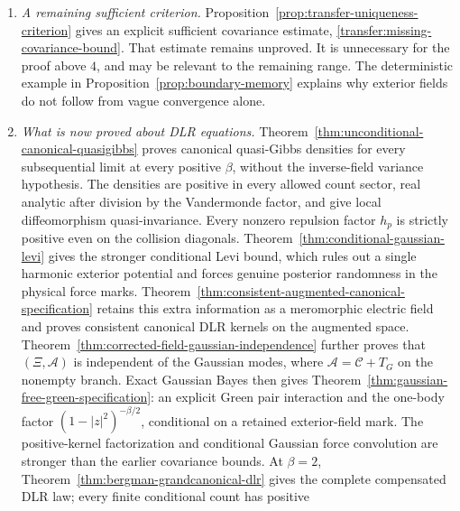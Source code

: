 \documentclass[11pt,a4paper]{article}
\numberwithin{equation}{section}
\theoremstyle{definition}
\theoremstyle{remark}
\begin{document}
\begin{enumerate}
to be analyzed. The independent reference has a Bergman limit for
every parameter, but its Gram likelihood is asymptotically singular
for $\beta\ge4$; direct transfer of that limit is therefore impossible
in that range. At $\beta=4$, the explicit hypergeometric mixture in
Theorem~\ref{thm:critical-su11-hypergeometric} reduces fixed orbital
occupations to primary-sector masses. Critical emptiness implies decay
of every fixed primary-sector occupation, although no direct norm
asymptotic or quantitative critical rate is obtained.
\item \emph{A remaining sufficient criterion.}
Proposition~\ref{prop:transfer-uniqueness-criterion} gives an explicit
sufficient covariance estimate, \eqref{transfer:missing-covariance-bound}.
That estimate remains unproved. It is unnecessary for the proof above
$4$, and may be relevant to the remaining range. The deterministic
example in Proposition~\ref{prop:boundary-memory} explains why exterior
fields do not follow from vague convergence alone.
\item \emph{What is now proved about DLR equations.}
Theorem~\ref{thm:unconditional-canonical-quasigibbs} proves canonical
quasi-Gibbs densities for every subsequential limit at every positive
$\beta$, without the inverse-field variance hypothesis. The densities
are positive in every allowed count sector, real analytic after
division by the Vandermonde factor, and give local diffeomorphism
quasi-invariance. Every nonzero repulsion factor $h_p$ is strictly
positive even on the collision diagonals. Theorem~\ref{thm:conditional-gaussian-levi}
gives the stronger conditional Levi bound, which rules out a single
harmonic exterior potential and forces genuine posterior randomness
in the physical force marks.
Theorem~\ref{thm:consistent-augmented-canonical-specification} retains
this extra information as a meromorphic electric field and proves
consistent canonical DLR kernels on the augmented space.
Theorem~\ref{thm:corrected-field-gaussian-independence} further proves
that $(\Xi,\mathcal A)$ is independent of the Gaussian modes, where
$\mathcal A=\mathcal C+T_G$ on the nonempty branch. Exact Gaussian
Bayes then gives Theorem~\ref{thm:gaussian-free-green-specification}:
an explicit Green pair interaction and the one-body factor
$(1-|z|^2)^{-\beta/2}$, conditional on a retained exterior-field mark.
The positive-kernel factorization and conditional Gaussian force
convolution are stronger than the earlier covariance bounds.
At $\beta=2$,
Theorem~\ref{thm:bergman-grandcanonical-dlr} gives the complete
compensated DLR law; every finite conditional count has positive

\end{enumerate}
\end{document}
